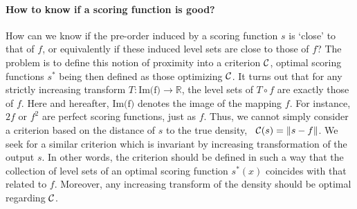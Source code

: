 
\paragraph{How to know if a scoring function is good?}
How can we know if the pre-order induced by a scoring function $s$ is `close' to that of $f$, or equivalently if these induced level sets are close to those of $f$? 
%
The problem is to define this notion of proximity into a criterion $\mathcal{C}$, optimal scoring functions $s^*$ being then defined as those optimizing $\mathcal{C}$. 
It turns out that for any strictly increasing transform $T: \text{Im(f)} \to \mathbb{R} $, the level sets of $T\circ f$ are exactly those of $f$. Here and hereafter, $\text{Im(f)} $ denotes the image of the mapping $f$. For instance, $2f$ or $f^2$ are perfect scoring functions, just as $f$. Thus, we cannot simply consider a criterion based on the distance of $s$ to the true density, \eg~$\mathcal{C}(s)=\|s - f\|$.
We seek for a similar criterion which is invariant by increasing transformation of the output $s$. In other words, the criterion should be defined in such a way that the collection of level sets of an optimal scoring function $s^*(x)$ coincides with that related to $f$. Moreover, any increasing transform of the density should be optimal regarding $\mathcal{C}$.

